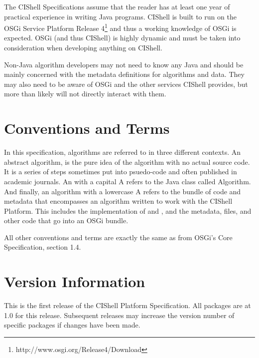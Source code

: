 The CIShell Specifications assume that the reader has at least one year of
practical experience in writing Java programs. CIShell is built to run on the
OSGi Service Platform Release 4\footnote{http://www.osgi.org/Release4/Download}
and thus a working knowledge of OSGi is expected. OSGi (and thus CIShell) is highly dynamic and must be taken into consideration
when developing anything on CIShell.

Non-Java algorithm developers may not need to know any Java and should be mainly
concerned with the metadata definitions for algorithms and data. They may also
need to be aware of OSGi and the other services CIShell provides, but more than
likely will not directly interact with them.

\section{Conventions and Terms}

In this specification, algorithms are referred to in three different contexts. An
abstract algorithm, is the pure idea of the algorithm with no actual source code.
It is a series of steps sometimes put into psuedo-code and often published in
academic journals. An  with a capital A refers to the Java class
called Algorithm. And finally, an algorithm with a lowercase A refers to the
bundle of code and metadata that encompasses an algorithm written to work with
the CIShell Platform. This includes the implementation of
 and , and the metadata, files, and
other code that go into an OSGi bundle.

All other conventions and terms are exactly the same as from OSGi's Core
Specification, section 1.4.

\section{Version Information}

This is the first release of the CIShell Platform Specification. All packages are
at 1.0 for this release. Subsequent releases may increase the version number of
specific packages if changes have been made.


